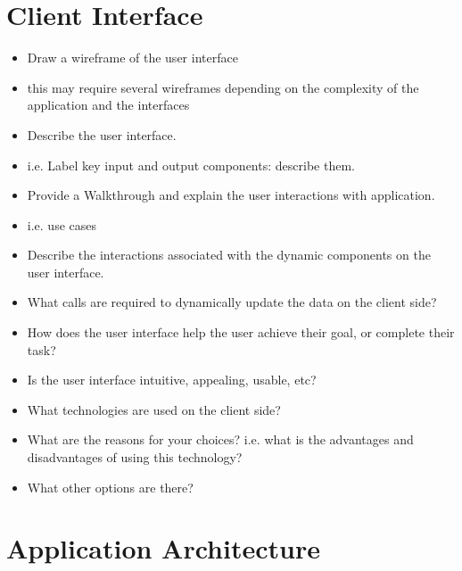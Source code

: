 \documentclass{sig-alt-release2}
\begin{document}
\section{Client Interface}
\begin{itemize}
\item	Draw a wireframe of the user interface
\item	this may require several wireframes depending on the complexity of the application and the interfaces
\item	Describe the user interface.
\item	i.e. Label key input and output components: describe them.
\item	Provide a Walkthrough and explain the user interactions with application. 
\item	i.e. use cases
\item	Describe the interactions associated with the dynamic components on the user interface.
\item	What calls are required to dynamically update the data on the client side?
\item	How does the user interface help the user achieve their goal, or complete their task? 
\item	Is the user interface intuitive, appealing, usable, etc?
\item	What technologies are used on the client side? 
\item	What are the reasons for your choices? i.e. what is the advantages and disadvantages of using this technology? 
\item	What other options are there? 
\end{itemize}

\section{Application Architecture}

\end{document}

